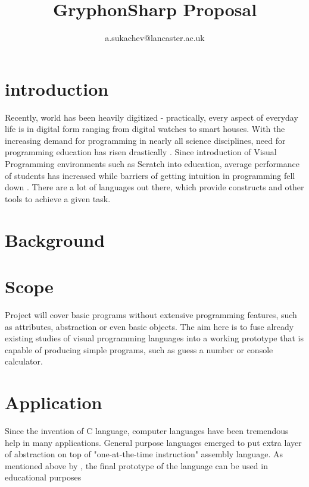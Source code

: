 \documentclass{report}
\author{a.sukachev@lancaster.ac.uk }
\title{GryphonSharp Proposal}
\date{\parbox{\linewidth}{\centering%
    \normalsize \noindent\rule{0.8\textwidth}{0.2pt}
    \vspace*{20pt}\endgraf
    Coordinator: Abe Karnik (a.karnik@lancaster.ac.uk)\endgraf
    Research group: MSc410 (Human Computer Interaction)
}}%
\begin{document}
\maketitle

\section{introduction}
Recently, world has been heavily digitized - practically, every aspect of everyday life is in digital form ranging from digital watches to smart houses. With the increasing demand for programming in nearly all science disciplines, need for programming education has risen drastically \citep{MargGoodBern2011wv, jovanovi_digitalization, 7318200}.
Since introduction of Visual Programming environments such as Scratch into education, average performance of students has increased \citep{tsai_2019_improving} while barriers of getting intuition in programming fell down \citep{kelleher_2005_lowering}.
There are a lot of languages out there, which provide constructs and other tools to achieve a given task.



\section{Background}

\section{Scope}
Project will cover basic programs without extensive programming features, such as attributes, abstraction or even basic objects. The aim here is to fuse already existing studies of visual programming languages into a working prototype that is capable of producing simple programs, such as guess a number or console calculator.

\section{Application}
Since the invention of C language, computer languages have been tremendous help in many applications. General purpose languages emerged to put extra layer of abstraction on top of "one-at-the-time instruction" assembly language.\citep{10.1145/364063.364092}
As mentioned above by \citep{kelleher_2005_lowering,tsai_2019_improving}, the final prototype of the language can be used in educational purposes
\end{document}
